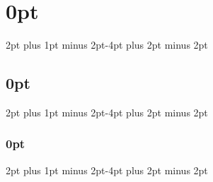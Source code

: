 
\usepackage[tmargin=2.2cm,bmargin=2.2cm,lmargin=2cm,rmargin=2cm]{geometry}
\setlength{\parindent}{0pt} %
\setlength{\parskip}{\baselineskip} %
\setlength{\baselineskip}{2.5pt}

\usepackage{titlesec}
\titlespacing\section{0pt}{2pt plus 1pt minus 2pt}{-4pt plus 2pt minus 2pt}
\titlespacing\subsection{0pt}{2pt plus 1pt minus 2pt}{-4pt plus 2pt minus 2pt}
\titlespacing\subsubsection{0pt}{2pt plus 1pt minus 2pt}{-4pt plus 2pt minus 2pt}

\usepackage{enumitem}


\usepackage[colorlinks=true,urlcolor=blue!30!black,linkcolor=blue!30!black,urlbordercolor={1 0 0},pdfborder=0]{hyperref}

\usepackage{graphicx} %
\graphicspath{{resources/}}
\usepackage{float}


\usepackage{tabularx}
\usepackage{amsmath,amsfonts,amsthm,amssymb}
\usepackage[usenames,dvipsnames,svgnames,table]{xcolor}


\usepackage{pdflscape}


\usepackage{array}
\usepackage{booktabs}

\renewcommand{\arraystretch}{1.2} %

\newcommand{\cellhead}[2]{\multicolumn{1}{#1}{\textbf{#2}}}


